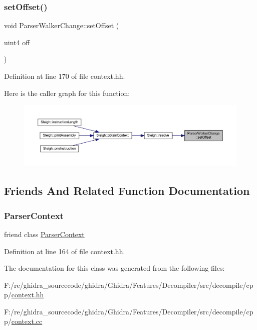 \subsubsection{\texorpdfstring{setOffset()}{setOffset()}}
{\footnotesize\ttfamily void Parser\+Walker\+Change\+::set\+Offset (\begin{DoxyParamCaption}\item[{uint4}]{off }\end{DoxyParamCaption})\hspace{0.3cm}{\ttfamily [inline]}}



Definition at line 170 of file context.\+hh.

Here is the caller graph for this function\+:
\nopagebreak
\begin{figure}[H]
\begin{center}
\leavevmode
\includegraphics[width=350pt]{class_parser_walker_change_a95880c16791ab4b8a3f3556826063c0c_icgraph}
\end{center}
\end{figure}


\subsection{Friends And Related Function Documentation}
\mbox{\label{class_parser_walker_change_a8f3a897ae30e39693692d15b6706db59}} 
\subsubsection{\texorpdfstring{ParserContext}{ParserContext}}
{\footnotesize\ttfamily friend class \mbox{\hyperlink{class_parser_context}{Parser\+Context}}\hspace{0.3cm}{\ttfamily [friend]}}



Definition at line 164 of file context.\+hh.



The documentation for this class was generated from the following files\+:\begin{DoxyCompactItemize}
\item 
F\+:/re/ghidra\+\_\+sourcecode/ghidra/\+Ghidra/\+Features/\+Decompiler/src/decompile/cpp/\mbox{\hyperlink{context_8hh}{context.\+hh}}\item 
F\+:/re/ghidra\+\_\+sourcecode/ghidra/\+Ghidra/\+Features/\+Decompiler/src/decompile/cpp/\mbox{\hyperlink{context_8cc}{context.\+cc}}\end{DoxyCompactItemize}
